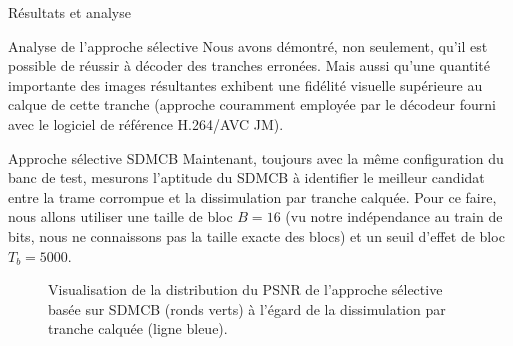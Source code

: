 \documentclass[letterpaper, twoside, 12pt,memoire]{thETS}
\newcommand{\ltCodec}{logiciel de référence H.264/AVC JM}
\begin{document}
\begin{chapter}{Résultats et analyse}
\begin{section}{Analyse de l'approche sélective}
Nous avons démontré, non seulement, qu'il est possible de réussir à décoder des
tranches erronées. Mais aussi qu'une quantité importante des images résultantes
exhibent une fidélité visuelle supérieure au calque de cette tranche (approche
couramment employée par le décodeur fourni avec le \ltCodec).

\begin{subsection}{Approche sélective SDMCB}
\label{sec-AnalyseSDMCB}
Maintenant, toujours avec la même configuration du banc de test, mesurons
l'aptitude du SDMCB à identifier le meilleur candidat entre la trame corrompue
et la dissimulation par tranche calquée. Pour ce faire, nous allons utiliser une
taille de bloc $B=16$ (vu notre indépendance au train de bits, nous ne
connaissons pas la taille exacte des blocs) et un seuil d'effet de bloc $T_b =
5000$.

\begin{figure}[htb]
\caption{Visualisation de la distribution du PSNR de l'approche sélective basée
sur SDMCB (ronds verts) à l'égard de la dissimulation par tranche calquée (ligne
bleue).}
\label{fig-SelectiveSliceCopy}
\end{figure}


\end{subsection}
\end{section}
\end{chapter}
\end{document}
